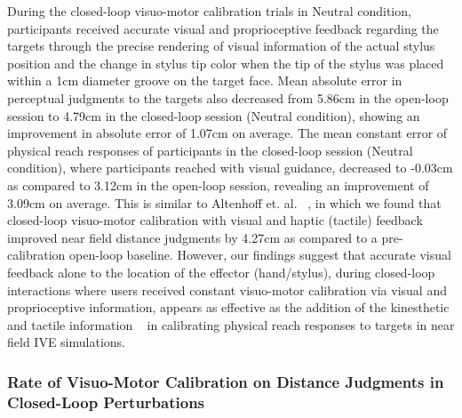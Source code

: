 During the closed-loop visuo-motor calibration trials in Neutral condition, participants received accurate visual and proprioceptive feedback regarding the targets through the precise rendering of visual information of the actual stylus position and the change in stylus tip color when the tip of the stylus was placed within a 1cm diameter groove on the target face. Mean absolute error in perceptual judgments to the targets also decreased from 5.86cm in the open-loop session to 4.79cm in the closed-loop session (Neutral condition), showing an improvement in absolute error of 1.07cm on average. The mean constant error of physical reach responses of participants in the closed-loop session (Neutral condition), where participants reached with visual guidance, decreased to -0.03cm as compared to 3.12cm in the open-loop session, revealing an improvement of 3.09cm on average. This is similar to Altenhoff et. al. ~\cite{ANL+12}, in which we found that closed-loop visuo-motor calibration with visual and haptic (tactile) feedback improved near field distance judgments by 4.27cm as compared to a pre-calibration open-loop baseline. However, our findings suggest that accurate visual feedback alone to the location of the effector (hand/stylus), during closed-loop interactions where users received constant visuo-motor calibration via visual and proprioceptive information, appears as effective as the addition of the kinesthetic and tactile information ~\cite{ANL+12} in calibrating physical reach responses to targets in near field IVE simulations.

\subsubsection{Rate of Visuo-Motor Calibration on Distance Judgments in Closed-Loop Perturbations}


